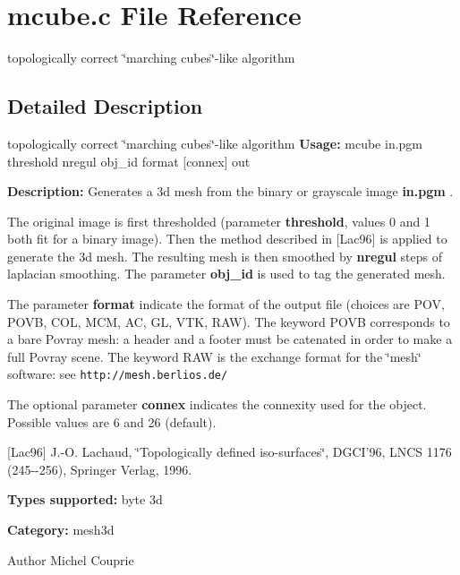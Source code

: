 \section{mcube.c File Reference}
\label{mcube_8c}


topologically correct \char`\"{}marching cubes\char`\"{}-\/like algorithm  




\subsection{Detailed Description}
topologically correct \char`\"{}marching cubes\char`\"{}-\/like algorithm {\bfseries Usage:} mcube in.pgm threshold nregul obj\_\-id format [connex] out

{\bfseries Description:} Generates a 3d mesh from the binary or grayscale image {\bfseries in.pgm} .

The original image is first thresholded (parameter {\bfseries threshold}, values 0 and 1 both fit for a binary image). Then the method described in [Lac96] is applied to generate the 3d mesh. The resulting mesh is then smoothed by {\bfseries nregul} steps of laplacian smoothing. The parameter {\bfseries obj\_\-id} is used to tag the generated mesh.

The parameter {\bfseries format} indicate the format of the output file (choices are POV, POVB, COL, MCM, AC, GL, VTK, RAW). The keyword POVB corresponds to a bare Povray mesh: a header and a footer must be catenated in order to make a full Povray scene. The keyword RAW is the exchange format for the \char`\"{}mesh\char`\"{} software: see {\tt http://mesh.berlios.de/}

The optional parameter {\bfseries connex} indicates the connexity used for the object. Possible values are 6 and 26 (default).

[Lac96] J.-\/O. Lachaud, \char`\"{}Topologically defined iso-\/surfaces\char`\"{}, DGCI'96, LNCS 1176 (245-\/-\/256), Springer Verlag, 1996.

{\bfseries Types supported:} byte 3d

{\bfseries Category:} mesh3d

\begin{DoxyAuthor}{Author}
Michel Couprie 
\end{DoxyAuthor}
